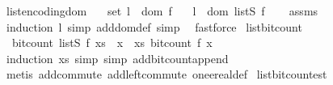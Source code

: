 \begin{isabellebody}
\endisatagproof
{\isafoldproof}%
%
\isadelimproof
\isanewline
%
\endisadelimproof
\isanewline
{}\isamarkupfalse%
\ list{\isacharunderscore}{\kern0pt}encoding{\isacharunderscore}{\kern0pt}dom{\isacharcolon}{\kern0pt}\isanewline
\ \ \ {\isachardoublequoteopen}set\ l\ {\isasymsubseteq}\ dom\ f{\isachardoublequoteclose}\isanewline
\ \ \ {\isachardoublequoteopen}l\ {\isasymin}\ dom\ {\isacharparenleft}{\kern0pt}list\isactrlsub S\ f{\isacharparenright}{\kern0pt}{\isachardoublequoteclose}\isanewline
%
\isadelimproof
\ \ %
\endisadelimproof
%
\isatagproof
{}\isamarkupfalse%
\ assms\ \isamarkupfalse%
\ {\isacharparenleft}{\kern0pt}induction\ l{\isacharcomma}{\kern0pt}\ simp\ add{\isacharcolon}{\kern0pt}dom{\isacharunderscore}{\kern0pt}def{\isacharcomma}{\kern0pt}\ simp{\isacharparenright}{\kern0pt}\ \isamarkupfalse%
\ fastforce%
\endisatagproof
{\isafoldproof}%
%
\isadelimproof
\isanewline
%
\endisadelimproof
\isanewline
{}\isamarkupfalse%
\ list{\isacharunderscore}{\kern0pt}bit{\isacharunderscore}{\kern0pt}count{\isacharcolon}{\kern0pt}\isanewline
\ \ {\isachardoublequoteopen}bit{\isacharunderscore}{\kern0pt}count\ {\isacharparenleft}{\kern0pt}list\isactrlsub S\ f\ xs{\isacharparenright}{\kern0pt}\ {\isacharequal}{\kern0pt}\ {\isacharparenleft}{\kern0pt}{\isasymSum}x\ {\isasymleftarrow}\ xs{\isachardot}{\kern0pt}\ bit{\isacharunderscore}{\kern0pt}count\ {\isacharparenleft}{\kern0pt}f\ x{\isacharparenright}{\kern0pt}\ {\isacharplus}{\kern0pt}\ {}{\isacharparenright}{\kern0pt}\ {\isacharplus}{\kern0pt}\ {}{\isachardoublequoteclose}\isanewline
%
\isadelimproof
\ \ %
\endisadelimproof
%
\isatagproof
{}\isamarkupfalse%
\ {\isacharparenleft}{\kern0pt}induction\ xs{\isacharcomma}{\kern0pt}\ simp{\isacharcomma}{\kern0pt}\ simp\ add{\isacharcolon}{\kern0pt}bit{\isacharunderscore}{\kern0pt}count{\isacharunderscore}{\kern0pt}append{\isacharparenright}{\kern0pt}\ \isanewline
\ \ \isamarkupfalse%
\ {\isacharparenleft}{\kern0pt}metis\ add{\isachardot}{\kern0pt}commute\ add{\isachardot}{\kern0pt}left{\isacharunderscore}{\kern0pt}commute\ one{\isacharunderscore}{\kern0pt}ereal{\isacharunderscore}{\kern0pt}def{\isacharparenright}{\kern0pt}%
\endisatagproof
{\isafoldproof}%
%
\isadelimproof
\isanewline
%
\endisadelimproof
\isanewline
{}\isamarkupfalse%
\ list{\isacharunderscore}{\kern0pt}bit{\isacharunderscore}{\kern0pt}count{\isacharunderscore}{\kern0pt}est{\isacharcolon}{\kern0pt}\isanewline

\end{isabellebody}
